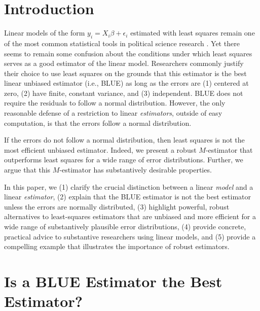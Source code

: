 \documentclass[12pt]{article}
\begin{document}

\thispagestyle{empty}

\newpage
\doublespace

\section*{Introduction}

Linear models of the form $y_i = X_i\beta + \epsilon_i$ estimated with least squares remain one of the most common statistical tools in political science research \citep{KruegerLewisBeck2008}. 
Yet there seems to remain some confusion about the conditions under which least squares serves as a good estimator of the linear model. 
Researchers commonly justify their choice to use least squares on the grounds that this estimator is the best linear unbiased estimator (i.e., BLUE) as long as the errors are (1) centered at zero, (2) have finite, constant variance, and (3) independent. 
BLUE does not require the residuals to follow a normal distribution. 
However, the only reasonable defense of a restriction to linear \textit{estimators}, outside of easy computation, is that the errors follow a normal distribution. 

If the errors do not follow a normal distribution, then least squares is not the most efficient unbiased estimator. 
Indeed, we present a robust $M$-estimator that outperforms least squares for a wide range of error distributions. 
Further, we argue that this $M$-estimator has substantively desirable properties.

In this paper, we (1) clarify the crucial distinction between a linear \textit{model} and a linear \textit{estimator}, (2) explain that the BLUE estimator is not the best estimator unless the errors are normally distributed, (3) highlight powerful, robust alternatives to least-squares estimators that are unbiased and more efficient for a wide range of substantively plausible error distributions, (4) provide concrete, practical advice to substantive researchers using linear models, and (5) provide a compelling example that illustrates the importance of robust estimators.

\section*{Is a BLUE Estimator the Best Estimator?}
\end{document}
